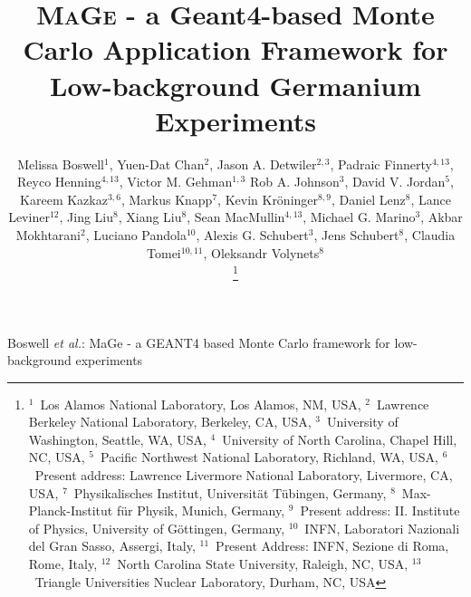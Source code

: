 \documentclass[article]{IEEEtran}
\begin{document}
\title{\textsc{MaGe} - a {\sc Geant4}-based Monte Carlo Application Framework for Low-background 
Germanium Experiments}

\author{Melissa Boswell$^{1}$, 
        Yuen-Dat Chan$^{2}$,
         Jason A. Detwiler$^{2,3}$,
         Padraic Finnerty$^{4,13}$,
	Reyco Henning$^{4,13}$, 
	Victor M. Gehman$^{1,3}$
	Rob A. Johnson$^{3}$, 
	David V. Jordan$^{5}$, 
	Kareem Kazkaz$^{3,6}$, 
	Markus Knapp$^{7}$, 
	Kevin Kr\"oninger$^{8,9}$, 
	Daniel Lenz$^{8}$,
	Lance Leviner$^{12}$,
	Jing Liu$^{8}$, 
	Xiang Liu$^{8}$, 
	Sean MacMullin$^{4,13}$,
	Michael G. Marino$^{3}$, 
	Akbar Mokhtarani$^{2}$, 
	Luciano Pandola$^{10}$, 
	Alexis G. Schubert$^{3}$, 
	Jens Schubert$^{8}$,
	Claudia Tomei$^{10,11}$,
	Oleksandr Volynets$^{8}$

\thanks{
  $^{1}$~Los Alamos National Laboratory, Los Alamos, NM, USA,
  $^{2}$~Lawrence Berkeley National Laboratory, Berkeley, CA, USA, 
  $^{3}$~University of Washington, Seattle, WA, USA, 
  $^{4}$~University of North Carolina, Chapel Hill, NC, USA, 
  $^{5}$~Pacific Northwest National Laboratory, Richland, WA, USA,	
  $^{6}$~Present address: Lawrence Livermore National Laboratory, Livermore, CA, USA, 
  $^{7}$~Physikalisches Institut, Universit\"at T\"ubingen, Germany, 
  $^{8}$~Max-Planck-Institut f\"ur Physik, Munich, Germany,  
  $^{9}$~Present address: II. Institute of Physics, University of G\"ottingen, Germany,
  $^{10}$~INFN, Laboratori Nazionali del Gran Sasso, Assergi, Italy,
  $^{11}$~Present Address: INFN, Sezione di Roma, Rome, Italy,
  $^{12}$~North Carolina State University, Raleigh, NC, USA,
  $^{13}$~Triangle Universities Nuclear Laboratory, Durham, NC, USA
        }
	
} 

%
{Boswell \MakeLowercase{\textit{et al.}}: {\sc MaGe} - a GEANT4 based
Monte Carlo framework for low-background experiments}

\maketitle


\newcommand{\Gerda}{\textsc{Gerda}}
\newcommand{\GeSS}{$^{76}\mathrm{Ge}$}
\newcommand{\GF}{\textsc{Geant4}}
\newcommand{\MaGe}{\textsc{MaGe}}
\newcommand{\MJ}{\textsc{Majorana}}
\newcommand{\nubb}{$0\nu\beta\beta$}

\end{document}

